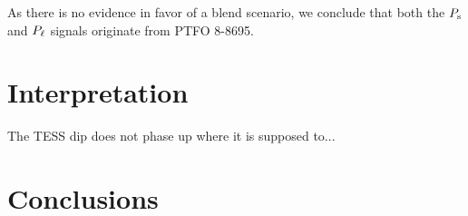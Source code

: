 \documentclass[12pt,twocolumn,tighten]{aastex62}
\begin{document}
As there is no evidence in favor of a blend scenario, we
conclude that both the $P_{\rm s}$ and $P_{\rm \ell}$ signals originate from PTFO 8-8695.

\section{Interpretation}
\label{sec:discussion}

The TESS dip does not phase up where it is supposed to...
\label{fig:o_minus_c}

\section{Conclusions}
\label{sec:conclusions}



\end{document}
